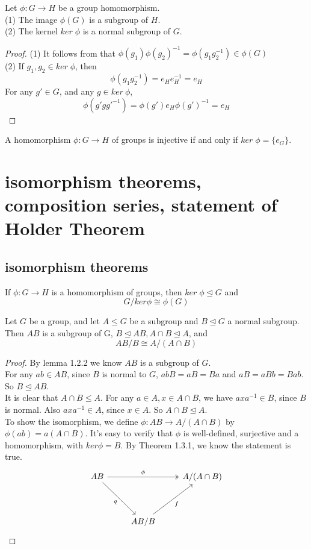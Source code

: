 \documentclass[11pt,fleqn]{book} %
\begin{document}
\begin{CJK}{UTF8}{gkai}
\begin{lemma}
	Let $\phi:G\to H$ be a group homomorphism. \\
	(1) The image $\phi(G)$ is a subgroup of $H$. \\
	(2) The kernel $ker \; \phi$ is a normal subgroup of $G$.
\end{lemma}
\begin{proof}
	(1) It follows from that $\phi(g_1)\phi(g_2)^{-1} = \phi(g_1g_2^{-1}) \in \phi(G)$ \\
	(2) If $g_1, g_2 \in ker \; \phi$, then 
	\[\phi(g_1g_2^{-1}) = e_He_H^{-1} = e_H\]
	For any $g' \in G$, and any $g \in ker \ \phi$, \[\phi(g'gg'^{-1}) = \phi(g')e_H\phi(g')^{-1} = e_H\]  
\end{proof}

\begin{lemma}
	A homomorphism $\phi: G \to H$ of groups is injective if and only if $ker \; \phi = \{e_G\}$.
\end{lemma}

\section{isomorphism theorems, composition series, statement of Holder Theorem}
\subsection{isomorphism theorems}

\begin{theorem}
	 If $\phi: G \to H$ is a homomorphism of groups, then $ker \; \phi \unlhd G$ and \[
		G / ker \phi \cong \phi(G) \]
\end{theorem}

\begin{theorem}
	 Let $G$ be a group, and let $A \leq G$ be a subgroup and $B \unlhd G$ a normal subgroup. Then $AB$ is a subgroup of G, $B \unlhd AB, A\cap B \unlhd A$, and 
	\[AB/B \cong A/(A\cap B)\]
\end{theorem}
\begin{proof}
	By lemma 1.2.2 we know $AB$ is a subgroup of $G$. \\
	For any $ab \in AB$, since $B$ is normal to $G$, $abB = aB = Ba$ and $aB = aBb = Bab$. So $B \unlhd AB$. \\
	It is clear that $A\cap B \leq A$. For any $a \in A, x \in A\cap B$, we have $axa^{-1} \in B$, since $B$ is normal. Also $axa^{-1} \in A$, since $x \in A$. So $A \cap B \unlhd A$. \\
	To show the isomorphism, we define $\phi: AB \to A/(A\cap B)$ by $\phi(ab) = a(A\cap B)$. It's easy to verify that $\phi$ is well-defined, surjective and a homomorphism, with $ker \phi = B$. By Theorem 1.3.1, we know the statement is true.
	\[\begin{tikzcd}
		AB && {A/(A\cap B)} \\
		\\
		& {AB/B}
		\arrow["\phi", two heads, from=1-1, to=1-3]
		\arrow["q"', from=1-1, to=3-2]
		\arrow["f"', from=3-2, to=1-3]
	\end{tikzcd}\]
\end{proof}


\end{CJK}
\end{document}
